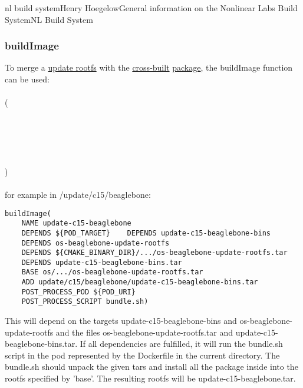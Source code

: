 \documentclass[11pt]{article}
\begin{document}
\begin{Name}{1}{nl build system}{Henry Hoegelow}{General information on the Nonlinear Labs Build System}{NL Build System}
\subsubsection{buildImage}
To merge a \hyperref[os-update]{update rootfs} with the \hyperref[crossbuild]{cross-built} \hyperref[package]{package}, the buildImage function can be used:\\
\\
(\\
\indent{}\\
\indent{}\\
\indent{}\\
\indent{}\\
\indent{}\\
\indent{})\\
\\
for example in /update/c15/beaglebone:

\begin{verbatim}
buildImage(
    NAME update-c15-beaglebone
    DEPENDS ${POD_TARGET}    DEPENDS update-c15-beaglebone-bins
    DEPENDS os-beaglebone-update-rootfs
    DEPENDS ${CMAKE_BINARY_DIR}/.../os-beaglebone-update-rootfs.tar
    DEPENDS update-c15-beaglebone-bins.tar
    BASE os/.../os-beaglebone-update-rootfs.tar
    ADD update/c15/beaglebone/update-c15-beaglebone-bins.tar
    POST_PROCESS_POD ${POD_URI}
    POST_PROCESS_SCRIPT bundle.sh)
\end{verbatim}
This will depend on the targets update-c15-beaglebone-bins and os-beaglebone-update-rootfs and the files os-beaglebone-update-rootfs.tar and update-c15-beaglebone-bins.tar. If all dependencies are fulfilled, it will run the bundle.sh script in the pod represented by the Dockerfile in the current directory. The bundle.sh should unpack the given tars and install all the package inside into the rootfs specified by 'base'. The resulting rootfs will be update-c15-beaglebone.tar.

\end{Name}
\end{document}
